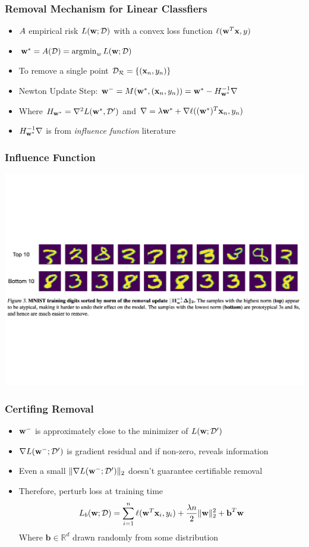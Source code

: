 \documentclass[pdf]{beamer}
\begin{document}
\begin{frame}
  \frametitle{Removal Mechanism for Linear Classfiers}
  \begin{itemize}
    \item $A$ empirical risk $L(\textbf{w};\mathcal{D})$ with a convex loss function $\ell(\textbf{w}^{T}\textbf{x},y)$
    \item $\textbf{w}^{*} = A(\mathcal{D})=\operatorname*{\arg\!\min}_{w}L(\textbf{w};\mathcal{D})$
    \item To remove a single point $\mathcal{D_{R}} = \{(\textbf{x}_{n},y_{n})\}$ 
    \item Newton Update Step: $\textbf{w}^{-}=M(\textbf{w}^{*},(\textbf{x}_{n},y_{n})) = \textbf{w}^{*} - H^{-1}_{\textbf{w}^{*}}\nabla$
    \item Where $H_{\textbf{w}^{*}} = \nabla^{2}L(\textbf{w}^{*},\mathcal{D}^{\prime})$ and $\nabla = \lambda\textbf{w}^{*} + \nabla\ell((\textbf{w}^{*})^{T}\textbf{x}_{n},y_{n})$
    \item $H ^{-1}_{\textbf{w}^{*}}\nabla$ is from \textit{influence function} literature \cite{kohUnderstandingBlackboxPredictions2017}
  \end{itemize}

\end{frame}

\begin{frame}
  \frametitle{Influence Function}
  \includegraphics[width=\textwidth]{images/influence functions.pdf}
\end{frame}

\begin{frame}
  \frametitle{Certifing Removal}
  \begin{itemize}
    \item $\textbf{w}^{-}$ is approximately close to the minimizer of $L(\textbf{w};\mathcal{D}^{\prime})$
    \item $\nabla L(\textbf{w}^{-};\mathcal{D}^{\prime})$ is gradient residual and if non-zero, reveals information
    \item Even a small $\|\nabla L(\textbf{w}^{-};\mathcal{D}^{\prime})\|_{2}$ doesn't guarantee certifiable removal 
    \item Therefore, perturb loss at training time 
    \[
      L_{b}(\textbf{w};\mathcal{D}) = \sum_{i=1}^{n}\ell(\textbf{w}^{T}\textbf{x}_{i},y_{i})+\frac{\lambda n}{2}\|\textbf{w}\|_{2}^{2} + \textbf{b}^{T}\textbf{w}
    \]
    Where $\textbf{b}\in \mathbb{R}^{d}$ drawn randomly from some distribution
  \end{itemize}

\end{frame}
\end{document}
